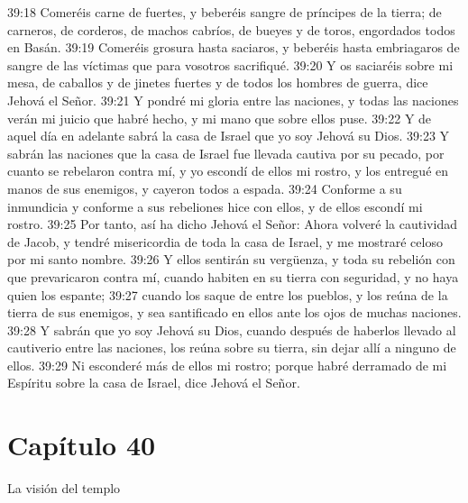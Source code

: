 39:18 Comeréis carne de fuertes, y beberéis sangre de príncipes de la tierra; de carneros, de corderos, de machos cabríos, de bueyes y de toros, engordados todos en Basán.   
39:19 Comeréis grosura hasta saciaros, y beberéis hasta embriagaros de sangre de las víctimas que para vosotros sacrifiqué.   
39:20 Y os saciaréis sobre mi mesa, de caballos y de jinetes fuertes y de todos los hombres de guerra, dice Jehová el Señor. 
39:21 Y pondré mi gloria entre las naciones, y todas las naciones verán mi juicio que habré hecho, y mi mano que sobre ellos puse.   
39:22 Y de aquel día en adelante sabrá la casa de Israel que yo soy Jehová su Dios.   
39:23 Y sabrán las naciones que la casa de Israel fue llevada cautiva por su pecado, por cuanto se rebelaron contra mí, y yo escondí de ellos mi rostro, y los entregué en manos de sus enemigos, y cayeron todos a espada.   
39:24 Conforme a su inmundicia y conforme a sus rebeliones hice con ellos, y de ellos escondí mi rostro.   
39:25 Por tanto, así ha dicho Jehová el Señor: Ahora volveré la cautividad de Jacob, y tendré misericordia de toda la casa de Israel, y me mostraré celoso por mi santo nombre.   
39:26 Y ellos sentirán su vergüenza, y toda su rebelión con que prevaricaron contra mí, cuando habiten en su tierra con seguridad, y no haya quien los espante;   
39:27 cuando los saque de entre los pueblos, y los reúna de la tierra de sus enemigos, y sea santificado en ellos ante los ojos de muchas naciones.   
39:28 Y sabrán que yo soy Jehová su Dios, cuando después de haberlos llevado al cautiverio entre las naciones, los reúna sobre su tierra, sin dejar allí a ninguno de ellos.   
39:29 Ni esconderé más de ellos mi rostro; porque habré derramado de mi Espíritu sobre la casa de Israel, dice Jehová el Señor.   
\section*{Capítulo 40 } 
La visión del templo   
  
